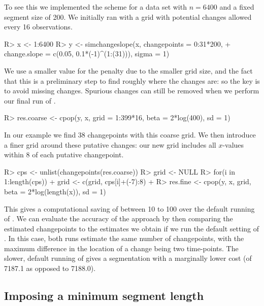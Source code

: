 \documentclass[article]{jss}
\begin{document}
To see this we implemented the scheme for a data set with $n=6400$ and a fixed segment size of 200.  We initially ran  with a grid with potential changes allowed every 16 observations.
\begin{CodeChunk}
\begin{CodeInput}
R> x <- 1:6400
R> y <- simchangeslope(x, changepoints = 0:31*200, 
+ change.slope = c(0.05, 0.1*(-1)^(1:(31))), sigma = 1)
\end{CodeInput}
\end{CodeChunk}

We use a smaller value for the penalty due to the smaller grid size, and the fact that this is a preliminary step to find roughly where the changes are: so the key is to avoid missing changes. Spurious changes can still be removed when we perform our final run of . 
\begin{CodeChunk}
\begin{CodeInput}
R> res.coarse <- cpop(y, x, grid = 1:399*16, beta = 2*log(400), sd = 1)
\end{CodeInput}
\end{CodeChunk}

In our example we find 38 changepoints with this coarse grid. We then introduce a finer grid around these putative changes: our new grid includes all $x$-values within 8 of each putative changepoint.
\begin{CodeChunk}
\begin{CodeInput}
R> cps <- unlist(changepoints(res.coarse))
R> grid <- NULL
R> for(i in 1:length(cps)) {
+   grid <- c(grid, cps[i]+(-7):8)
+ }
R> res.fine <- cpop(y, x, grid, beta = 2*log(length(x)), sd = 1)
\end{CodeInput}
\end{CodeChunk}

This gives a computational saving of between 10 to 100 over the default running of . We can evaluate the accuracy of the approach by then comparing the estimated changepoints to the estimates we obtain if we run the default setting of . In this case, both runs estimate the same number of changepoints, with the maximum difference in the location of a change being two time-points. The slower, default running of  gives a segmentation with a marginally lower cost (of 7187.1 as opposed to 7188.0).

\subsection{Imposing a minimum segment length}
\end{document}
